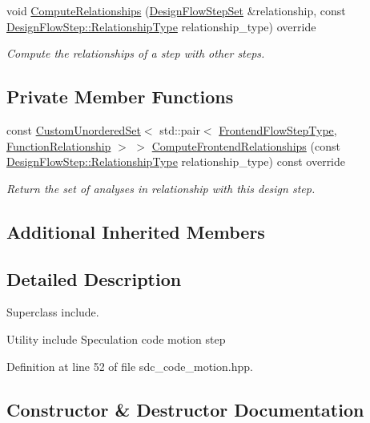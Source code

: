 \begin{DoxyCompactItemize}
void \hyperlink{classSDCCodeMotion_aba1edb7d7851104686225cf6aaa92c56}{Compute\+Relationships} (\hyperlink{classDesignFlowStepSet}{Design\+Flow\+Step\+Set} \&relationship, const \hyperlink{classDesignFlowStep_a723a3baf19ff2ceb77bc13e099d0b1b7}{Design\+Flow\+Step\+::\+Relationship\+Type} relationship\+\_\+type) override
\begin{DoxyCompactList}\small\item\em Compute the relationships of a step with other steps. \end{DoxyCompactList}\end{DoxyCompactItemize}
\subsection*{Private Member Functions}
\begin{DoxyCompactItemize}
\item 
const \hyperlink{classCustomUnorderedSet}{Custom\+Unordered\+Set}$<$ std\+::pair$<$ \hyperlink{frontend__flow__step_8hpp_afeb3716c693d2b2e4ed3e6d04c3b63bb}{Frontend\+Flow\+Step\+Type}, \hyperlink{classFrontendFlowStep_af7cf30f2023e5b99e637dc2058289ab0}{Function\+Relationship} $>$ $>$ \hyperlink{classSDCCodeMotion_a98805e7900d0d802e0bda748ea581a79}{Compute\+Frontend\+Relationships} (const \hyperlink{classDesignFlowStep_a723a3baf19ff2ceb77bc13e099d0b1b7}{Design\+Flow\+Step\+::\+Relationship\+Type} relationship\+\_\+type) const override
\begin{DoxyCompactList}\small\item\em Return the set of analyses in relationship with this design step. \end{DoxyCompactList}\end{DoxyCompactItemize}
\subsection*{Additional Inherited Members}


\subsection{Detailed Description}
Superclass include. 

Utility include Speculation code motion step 

Definition at line 52 of file sdc\+\_\+code\+\_\+motion.\+hpp.



\subsection{Constructor \& Destructor Documentation}
\mbox{\label{classSDCCodeMotion_a7fa30bd2c85b0532071a1d813776cf53}} 
